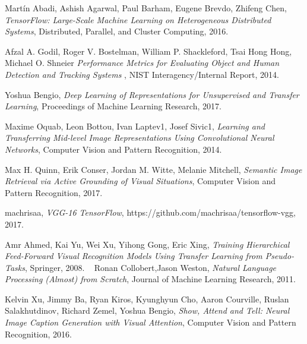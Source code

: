 \documentclass [11pt,letterpaper ,twoside ,openany ]{report}
\begin{document}
\begin{thebibliography}{9}
           Martín Abadi, Ashish Agarwal, Paul Barham, Eugene Brevdo, Zhifeng Chen,
          \textit{TensorFlow: Large-Scale Machine Learning on Heterogeneous Distributed Systems},
          Distributed, Parallel, and Cluster Computing,
          2016.                                                   

          Afzal A. Godil, Roger V. Bostelman, William P. Shackleford, Tsai Hong Hong, Michael O. Shneier 
          \textit{Performance Metrics for Evaluating Object and Human Detection and Tracking Systems },
          NIST Interagency/Internal Report,
          2014.                 

          Yoshua Bengio,
          \textit{Deep Learning of Representations for Unsupervised and Transfer Learning},
          Proceedings of Machine Learning Research,
          2017.                               

          Maxime Oquab, Leon Bottou, Ivan Laptev1, Josef Sivic1,
          \textit{Learning and Transferring Mid-level Image Representations Using Convolutional Neural Networks},
          Computer Vision and Pattern Recognition,
          2014.

          Max H. Quinn, Erik Conser, Jordan M. Witte, Melanie Mitchell,
          \textit{Semantic Image Retrieval via Active Grounding of Visual Situations},
          Computer Vision and Pattern Recognition,
          2017.          

          machrisaa,
          \textit{VGG-16 TensorFlow},
          https://github.com/machrisaa/tensorflow-vgg,
          2017.                    

          Amr Ahmed, Kai Yu, Wei Xu, Yihong Gong, Eric Xing,
          \textit{Training Hierarchical Feed-Forward Visual Recognition Models Using Transfer Learning from Pseudo-Tasks},
          Springer,
          2008.                                        
\          
          Ronan Collobert,Jason Weston,
          \textit{Natural Language Processing (Almost) from Scratch},
          Journal of Machine Learning Research,
          2011.                             

          Kelvin Xu, Jimmy Ba, Ryan Kiros, Kyunghyun Cho, Aaron Courville, Ruslan Salakhutdinov, Richard Zemel, Yoshua Bengio,
          \textit{Show, Attend and Tell: Neural Image Caption Generation with Visual Attention},
          Computer Vision and Pattern Recognition,
          2016.                                


\end{thebibliography}
\end{document}
